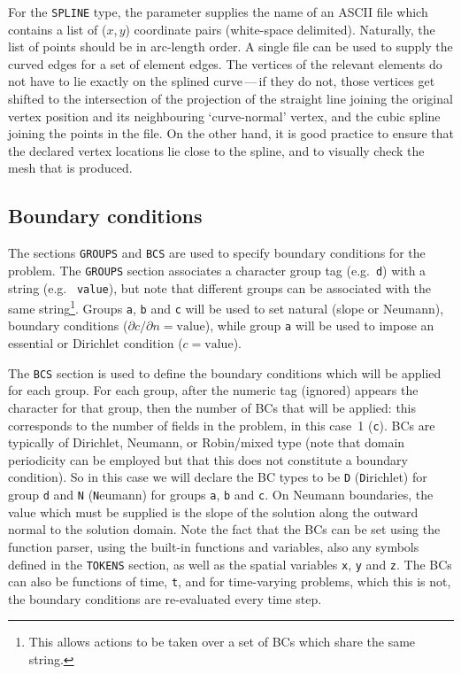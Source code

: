 \documentclass[11pt]{report}
\newcommand{\eg}{e.g.\ } \newcommand{\CC}{\mathrm{c.c.}}
\begin{document}
For the \texttt{SPLINE} type, the parameter supplies the name of an
ASCII file which contains a list of ($x$,\,$y$) coordinate pairs
(white-space delimited). Naturally, the list of points should be in
arc-length order. A single file can be used to supply the curved edges
for a set of element edges. The vertices of the relevant elements do
not have to lie exactly on the splined curve\,---\,if they do not,
those vertices get shifted to the intersection of the projection of
the straight line joining the original vertex position and its
neighbouring `curve-normal' vertex, and the cubic spline joining the
points in the file. On the other hand, it is good practice to ensure
that the declared vertex locations lie close to the spline, and to
visually check the mesh that is produced.

\subsection{Boundary conditions}

The sections \texttt{GROUPS} and \texttt{BCS} are used to specify
boundary conditions for the problem.  The \texttt{GROUPS} section
associates a character group tag (\eg \verb+d+) with a string (\eg
\verb+value+), but note that different groups can be associated with
the same string\footnote{This allows actions to be taken over a set of
  BCs which share the same string.}.  Groups \verb+a+, \verb+b+ and
\verb+c+ will be used to set natural (\ie slope or Neumann), boundary
conditions ($\partial c/\partial n=\textrm{value}$), while group
\verb+a+ will be used to impose an essential or Dirichlet condition
($c=\textrm{value}$).

The \texttt{BCS} section is used to define the boundary conditions
which will be applied for each group.  For each group, after the
numeric tag (ignored) appears the character for that group, then the
number of BCs that will be applied: this corresponds to the number of
fields in the problem, in this case~1 (\verb+c+).  BCs are typically
of Dirichlet, Neumann, or Robin/mixed type (note that domain
periodicity can be employed but that this does not constitute a
boundary condition).  So in this case we will declare the BC types to
be \verb+D+ ({\texttt D}irichlet) for group \verb+d+ and \verb+N+
({\texttt N}eumann) for groups \verb+a+, \verb+b+ and \verb+c+.  On
Neumann boundaries, the value which must be supplied is the slope of
the solution along the outward normal to the solution domain.  Note
the fact that the BCs can be set using the function parser, using the
built-in functions and variables, also any symbols defined in the
\texttt{TOKENS} section, as well as the spatial variables \verb+x+,
\verb+y+ and \verb+z+.  The BCs can also be functions of time,
\verb+t+, and for time-varying problems, which this is not, the
boundary conditions are re-evaluated every time step.
\end{document}
